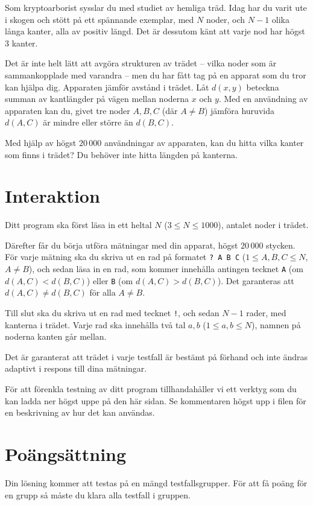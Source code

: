 Som kryptoarborist sysslar du med studiet av hemliga träd.
Idag har du varit ute i skogen och stött på ett spännande exemplar, med $N$ noder,
och $N-1$ olika långa kanter, alla av positiv längd.
Det är dessutom känt att varje nod har högst $3$ kanter.

Det är inte helt lätt att avgöra strukturen av trädet --
vilka noder som är sammankopplade med varandra --
men du har fått tag på en apparat som du tror kan hjälpa dig.
Apparaten jämför avstånd i trädet.
Låt $d(x, y)$ beteckna summan av kantlängder på vägen mellan noderna $x$ och $y$.
Med en användning av apparaten kan du, givet tre noder $A, B, C$ (där $A \neq B$) jämföra huruvida $d(A, C)$ är mindre eller större än $d(B, C)$.

Med hjälp av högst $20\,000$ användningar av apparaten, kan du hitta vilka kanter som finns i trädet?
Du behöver inte hitta längden på kanterna.

\section*{Interaktion}
Ditt program ska först läsa in ett heltal $N$ ($3 \leq N \leq 1000$), antalet noder i trädet.

Därefter får du börja utföra mätningar med din apparat, högst $20\,000$ stycken.
För varje mätning ska du skriva ut en rad på formatet \texttt{? A B C} ($1 \le A, B, C \le N$, $A \neq B$),
och sedan läsa in en rad, som kommer innehålla antingen tecknet \texttt A (om $d(A, C) < d(B, C)$) eller \texttt B (om $d(A, C) > d(B, C)$).
Det garanteras att $d(A, C) \neq d(B, C)$ för alla $A \neq B$.

Till slut ska du skriva ut en rad med tecknet \texttt{!}, och sedan $N-1$ rader, med kanterna i trädet.
Varje rad ska innehålla två tal $a, b$ ($1 \le a, b \le N$), namnen på noderna kanten går mellan.

Det är garanterat att trädet i varje testfall är bestämt på förhand och inte ändras adaptivt i respons till dina mätningar.

För att förenkla testning av ditt program tillhandahåller vi ett verktyg som du kan ladda ner högst uppe på den här sidan.
Se kommentaren högst upp i filen för en beskrivning av hur det kan användas.

\section*{Poängsättning}
Din lösning kommer att testas på en mängd testfallsgrupper.
För att få poäng för en grupp så måste du klara alla testfall i gruppen.


